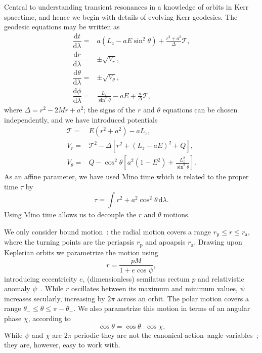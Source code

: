 \documentclass[aps,prd,amsfonts,amssymb,amsmath,nofootinbib,showpacs,superscriptaddress,twocolumn,floatfix]{revtex4-1}
\newcommand{\sub}[1]{\ensuremath{_\mathrm{#1}}}
\newcommand{\dd}{\ensuremath{\mathrm{d}}}
\newcommand{\diff}[2]{\ensuremath{\dfrac{\dd {#1}}{\dd {#2}}}}
\newcommand{\intd}[4]{\ensuremath{\int_{#1}^{#2}{#3}\,\dd{#4}}}
\begin{document}
Central to understanding transient resonances in a knowledge of orbits in Kerr spacetime, and hence we begin with details of evolving Kerr geodesics. The geodesic equations may be written as~\cite{Carter1968, Chandrasekhar1992} %
\begin{subequations}
\begin{align}
\diff{t}{\lambda} = {} & a\left(L_z - aE\sin^2 \theta\right) + \frac{r^2 + a^2}{\Delta}\mathcal{T},\\
\diff{r}{\lambda} = {} & \pm \sqrt{V_r},\\
\diff{\theta}{\lambda} = {} & \pm \sqrt{V_\theta},\\
\diff{\phi}{\lambda} = {} & \frac{L_z}{\sin^2 \theta} - aE + \frac{a}{\Delta}\mathcal{T},
\end{align}
\end{subequations}
where $\Delta = r^2 - 2M r + a^2$; the signs of the $r$ and $\theta$ equations can be chosen independently, and we have introduced potentials
\begin{subequations}
\begin{align}
\mathcal{T} = {} & E\left(r^2 +a^2\right) - aL_z,\\
V_r = {} & \mathcal{T}^2 - \Delta\left[r^2 + \left(L_z -aE\right)^2 + Q\right],\\
V_\theta = {} & Q - \cos^2 \theta\left[a^2\left(1 - E^2\right) + {\displaystyle \frac{L_z^2}{\sin^2\theta}}\right].
\end{align}
\end{subequations}
As an affine parameter, we have used Mino time which is related to the proper time $\tau$ by~\cite{Mino2003}
\begin{equation}
\tau = \intd{}{}{r^2 + a^2 \cos^2\theta}{\lambda}.
\end{equation}
Using Mino time allows us to decouple the $r$ and $\theta$ motions.

We only consider bound motion~\cite{Wilkins1972}: the radial motion covers a range $r\sub{p} \leq r \leq r\sub{a}$, where the turning points are the periapsis $r\sub{p}$ and apoapsis $r\sub{a}$. Drawing upon Keplerian orbits we parametrize the motion using
\begin{equation}
r = \frac{p M}{1+e\cos\psi},
\end{equation}
introducing eccentricity $e$, (dimensionless) semilatus rectum $p$ and relativistic anomaly $\psi$~\cite{Darwin1961,Drasco2004}. While $r$ oscillates between its maximum and minimum values, $\psi$ increases secularly, increasing by $2\pi$ across an orbit. The polar motion covers a range $\theta_- \leq \theta \leq \pi - \theta_-$. We also parametrize this motion in terms of an angular phase $\chi$, according to~\cite{Hughes2000}
\begin{equation}
\cos\theta = \cos\theta_-\cos\chi.
\end{equation}
While $\psi$ and $\chi$ are $2\pi$ periodic they are not the canonical action--angle variables~\cite{Schmidt2002}; they are, however, easy to work with.
\end{document}
